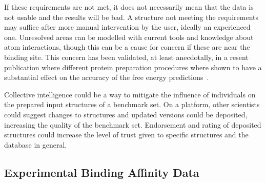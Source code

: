 \documentclass[9pt,bestpractices]{livecoms}
\begin{document}
%
If these requirements are not met, it does not necessarily mean that the data is not usable and the results will be bad. A structure not meeting the requirements may suffice after more manual intervention by the user, ideally an experienced one. Unresolved areas can be modelled with current tools and knowledge about atom interactions, though this can be a cause for concern if these are near the binding site. This concern has been validated, at least anecdotally, in a resent publication where different protein preparation procedures where shown to have a substantial effect on the accuracy of the free energy predictions~\cite{shih_impact_2020}.


Collective intelligence could be a way to mitigate the influence of individuals on the prepared input structures of a benchmark set. On a platform, other scientists could suggest changes to structures and updated versions could be deposited, increasing the quality of the benchmark set. Endorsement and rating of deposited structures could increase the level of trust given to specific structures and the database in general.


\subsection{Experimental Binding Affinity Data}
\label{sec:affinities}
\end{document}
